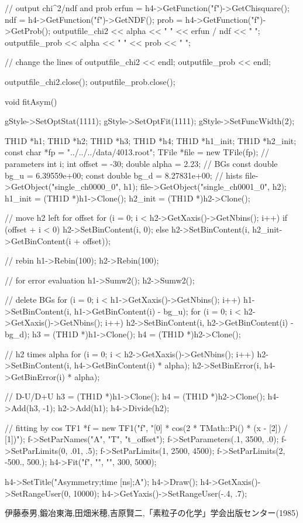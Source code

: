 \documentclass[dvipdfmx]{jsarticle}
\begin{document}
\begin{mylisting}[language=c++,caption=findPar.C]
{{        // output chi^2/ndf and prob
        erfun = h4->GetFunction("f")->GetChisquare();
        ndf = h4->GetFunction("f")->GetNDF();
        prob = h4->GetFunction("f")->GetProb();
        outputfile_chi2 << alpha << " " << erfun / ndf << " ";
        outputfile_prob << alpha << " " << prob << " ";

        // change the lines of
        outputfile_chi2 << endl;
        outputfile_prob << endl;
    }
    outputfile_chi2.close();
    outputfile_prob.close();
}
\end{mylisting}

\begin{mylisting}[language=c++,caption=fitAsym.C]
void fitAsym()
{
    gStyle->SetOptStat(1111);
    gStyle->SetOptFit(1111);
    gStyle->SetFuncWidth(2);

    TH1D *h1;
    TH1D *h2;
    TH1D *h3;
    TH1D *h4;
    TH1D *h1_init;
    TH1D *h2_init;
    const char *fp = "../../../data/4013.root";
    TFile *file = new TFile(fp);
    // parameters
    int i;
    int offset = -30;
    double alpha = 2.23;
    // BGs
    const double bg_u = 6.39559e+00;
    const double bg_d = 8.27831e+00;
    // hists
    file->GetObject("single_ch0000_0", h1);
    file->GetObject("single_ch0001_0", h2);
    h1_init = (TH1D *)h1->Clone();
    h2_init = (TH1D *)h2->Clone();

    // move h2 left for offset
    for (i = 0; i < h2->GetXaxis()->GetNbins(); i++)
    {
        if (offset + i < 0)
        {
            h2->SetBinContent(i, 0);
        }
        else
        {
            h2->SetBinContent(i, h2_init->GetBinContent(i + offset));
        }
    }

    // rebin
    h1->Rebin(100);
    h2->Rebin(100);

    // for error evaluation
    h1->Sumw2();
    h2->Sumw2();

    // delete BGs
    for (i = 0; i < h1->GetXaxis()->GetNbins(); i++)
    {
        h1->SetBinContent(i, h1->GetBinContent(i) - bg_u);
    }
    for (i = 0; i < h2->GetXaxis()->GetNbins(); i++)
    {
        h2->SetBinContent(i, h2->GetBinContent(i) - bg_d);
    }
    h3 = (TH1D *)h1->Clone();
    h4 = (TH1D *)h2->Clone();

    // h2 times alpha
    for (i = 0; i < h2->GetXaxis()->GetNbins(); i++)
    {
        h2->SetBinContent(i, h4->GetBinContent(i) * alpha);
        h2->SetBinError(i, h4->GetBinError(i) * alpha);
    }

    // D-U/D+U
    h3 = (TH1D *)h1->Clone();
    h4 = (TH1D *)h2->Clone();
    h4->Add(h3, -1);
    h2->Add(h1);
    h4->Divide(h2);

    // fitting by cos
    TF1 *f = new TF1("f", "[0] * cos(2 * TMath::Pi() * (x - [2]) / [1])");
    f->SetParNames("A", "T", "t_offset");
    f->SetParameters(.1, 3500, .0);
    f->SetParLimits(0, .01, .5);
    f->SetParLimits(1, 2500, 4500);
    f->SetParLimits(2, -500., 500.);
    h4->Fit("f", "", "", 300, 5000);

    h4->SetTitle("Asymmetry;time [ns];A");
    h4->Draw();
    h4->GetXaxis()->SetRangeUser(0, 10000);
    h4->GetYaxis()->SetRangeUser(-.4, .7);
}
\end{mylisting}



\begin{thebibliography}{10}
     伊藤泰男,鍛冶東海,田畑米穂,吉原賢二,「素粒子の化学」学会出版センター(1985)
\end{thebibliography}
\end{document}
